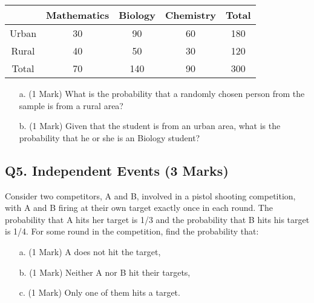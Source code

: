 \documentclass[a4paper,12pt]{article}
\begin{document}
\begin{center}
\begin{tabular}{|c|c|c|c|c|}
  \hline
   & Mathematics & Biology & Chemistry & Total \\\hline
  Urban& 30 & 90 & 60 & 180 \\  \hline
  Rural & 40 & 50 & 30 & 120 \\ \hline
  Total & 70 & 140 & 90 & 300 \\
  \hline
\end{tabular}
\end{center}

\begin{itemize}
\item[a.] (1 Mark) What is the probability that a randomly chosen person from the sample is
from a rural area?
\item[b.] (1 Mark) Given that the student is from an urban area, what is the probability that he or she is an Biology student?
\end{itemize}

\subsection*{Q5. Independent Events (3 Marks) } %

Consider two competitors, A and B, involved in a pistol shooting competition, with A and B firing at their own target exactly once in each round. The probability that A hits her target is 1/3 and the probability that B hits his target is 1/4. For some round in the competition, find the probability that:
\begin{itemize}
\item[a.](1 Mark) A does not hit the target,
\item[b.](1 Mark) Neither A nor B hit their targets,
\item[c.](1 Mark) Only one of them hits a target.
\end{itemize}
\end{document}
